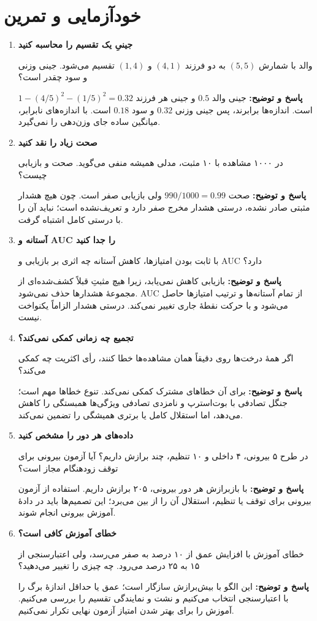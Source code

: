 \documentclass[12pt,a4paper,oneside]{report}
\newcounter{ex}[chapter]
\newenvironment{selftests}{\begin{enumerate}\setlength{\itemsep}{9pt}}{\end{enumerate}}
\newenvironment{selftest}[1]{\item\textbf{#1}\par}{\par}
\newcommand{\answer}[1]{\par{\color{teal}\bfseries پاسخ و توضیح: }#1\par}
\begin{document}
\section{خودآزمایی و تمرین}
\begin{selftests}
\begin{selftest}{جینیِ یک تقسیم را محاسبه کنید}
والد با شمارش $(5,5)$ به دو فرزند $(4,1)$ و $(1,4)$ تقسیم می‌شود. جینی وزنی و سود چقدر است؟
\answer{جینی والد $0.5$ و جینی هر فرزند $1-(4/5)^2-(1/5)^2=0.32$ است. اندازه‌ها برابرند، پس جینی وزنی $0.32$ و سود $0.18$ است. با اندازه‌های نابرابر، میانگین ساده جای وزن‌دهی را نمی‌گیرد.}
\end{selftest}
\begin{selftest}{صحت زیاد را نقد کنید}
در ۱۰۰۰ مشاهده با ۱۰ مثبت، مدلی همیشه منفی می‌گوید. صحت و بازیابی چیست؟
\answer{صحت $990/1000=0.99$ ولی بازیابی صفر است. چون هیچ هشدار مثبتی صادر نشده، درستی هشدار مخرج صفر دارد و تعریف‌نشده است؛ نباید آن را با درستی کامل اشتباه گرفت.}
\end{selftest}
\begin{selftest}{آستانه و AUC را جدا کنید}
با ثابت بودن امتیازها، کاهش آستانه چه اثری بر بازیابی و AUC دارد؟
\answer{بازیابی کاهش نمی‌یابد، زیرا هیچ مثبتِ قبلاً کشف‌شده‌ای از مجموعهٔ هشدارها حذف نمی‌شود. AUC از تمام آستانه‌ها و ترتیب امتیازها حاصل می‌شود و با حرکت نقطهٔ جاری تغییر نمی‌کند. درستی هشدار الزاماً یکنواخت نیست.}
\end{selftest}
\begin{selftest}{تجمیع چه زمانی کمکی نمی‌کند؟}
اگر همهٔ درخت‌ها روی دقیقاً همان مشاهده‌ها خطا کنند، رأی اکثریت چه کمکی می‌کند؟
\answer{برای آن خطاهای مشترک کمکی نمی‌کند. تنوع خطاها مهم است؛ جنگل تصادفی با بوت‌استرپ و نامزدی تصادفی ویژگی‌ها همبستگی را کاهش می‌دهد، اما استقلال کامل یا برتری همیشگی را تضمین نمی‌کند.}
\end{selftest}
\begin{selftest}{داده‌های هر دور را مشخص کنید}
در طرح ۵ بیرونی، ۴ داخلی و ۱۰ تنظیم، چند برازش داریم؟ آیا آزمون بیرونی برای توقف زودهنگام مجاز است؟
\answer{با بازبرازش هر دور بیرونی، ۲۰۵ برازش داریم. استفاده از آزمون بیرونی برای توقف یا تنظیم، استقلال آن را از بین می‌برد؛ این تصمیم‌ها باید در دادهٔ آموزش بیرونی انجام شوند.}
\end{selftest}
\begin{selftest}{خطای آموزش کافی است؟}
خطای آموزش با افزایش عمق از ۱۰ درصد به صفر می‌رسد، ولی اعتبارسنجی از ۱۵ به ۲۵ درصد می‌رود. چه چیزی را تغییر می‌دهید؟
\answer{این الگو با بیش‌برازش سازگار است؛ عمق یا حداقل اندازهٔ برگ را با اعتبارسنجی انتخاب می‌کنیم و نشت و نمایندگی تقسیم را بررسی می‌کنیم. آموزش را برای بهتر شدن امتیاز آزمون نهایی تکرار نمی‌کنیم.}

\end{selftest}
\end{selftests}
\end{document}
